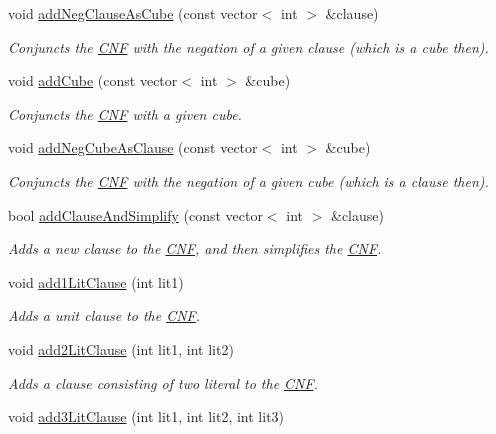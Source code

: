 \begin{DoxyCompactItemize}
void \hyperlink{classCNF_a1e98842bbdcb8666d40289b15b943682}{add\-Neg\-Clause\-As\-Cube} (const vector$<$ int $>$ \&clause)
\begin{DoxyCompactList}\small\item\em Conjuncts the \hyperlink{classCNF}{C\-N\-F} with the negation of a given clause (which is a cube then). \end{DoxyCompactList}\item 
void \hyperlink{classCNF_aa8621fad1a9a7b3022a79f5f735f5da2}{add\-Cube} (const vector$<$ int $>$ \&cube)
\begin{DoxyCompactList}\small\item\em Conjuncts the \hyperlink{classCNF}{C\-N\-F} with a given cube. \end{DoxyCompactList}\item 
void \hyperlink{classCNF_a84d01cd19e3032fb8d3bc7eaaaa40e34}{add\-Neg\-Cube\-As\-Clause} (const vector$<$ int $>$ \&cube)
\begin{DoxyCompactList}\small\item\em Conjuncts the \hyperlink{classCNF}{C\-N\-F} with the negation of a given cube (which is a clause then). \end{DoxyCompactList}\item 
bool \hyperlink{classCNF_a05caebe9e73a96d5f1050b3950434700}{add\-Clause\-And\-Simplify} (const vector$<$ int $>$ \&clause)
\begin{DoxyCompactList}\small\item\em Adds a new clause to the \hyperlink{classCNF}{C\-N\-F}, and then simplifies the \hyperlink{classCNF}{C\-N\-F}. \end{DoxyCompactList}\item 
void \hyperlink{classCNF_a8216b088c24fea1fd0cb1eecd16daabf}{add1\-Lit\-Clause} (int lit1)
\begin{DoxyCompactList}\small\item\em Adds a unit clause to the \hyperlink{classCNF}{C\-N\-F}. \end{DoxyCompactList}\item 
void \hyperlink{classCNF_adf7334d8029d4882cfb5ee21b01ac668}{add2\-Lit\-Clause} (int lit1, int lit2)
\begin{DoxyCompactList}\small\item\em Adds a clause consisting of two literal to the \hyperlink{classCNF}{C\-N\-F}. \end{DoxyCompactList}\item 
void \hyperlink{classCNF_a14154cae28b27dffc53239af7b39c4b4}{add3\-Lit\-Clause} (int lit1, int lit2, int lit3)

\end{DoxyCompactItemize}
